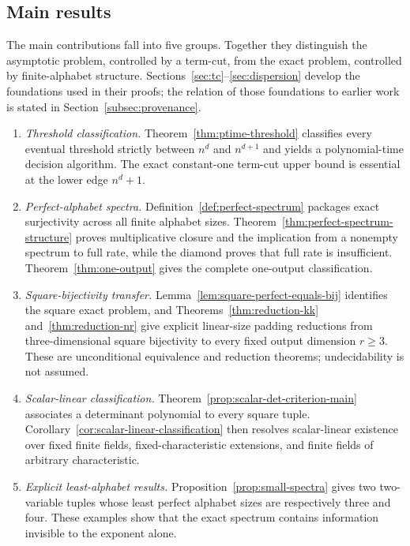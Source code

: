 \documentclass[11pt]{article}
\theoremstyle{definition}
\theoremstyle{plain}
\begin{document}
\subsection{Main results}
\label{subsec:new-results}
The main contributions fall into five groups.  Together they distinguish the asymptotic problem, controlled by
a term-cut, from the exact problem, controlled by finite-alphabet structure.  Sections~\ref{sec:tc}--\ref{sec:dispersion}
develop the foundations used in their proofs; the relation of those foundations to earlier work is stated in
Section~\ref{subsec:provenance}.
\begin{enumerate}[label=(\textbf{N\arabic*}), leftmargin=*]
\item \emph{Threshold classification.}
      Theorem~\ref{thm:ptime-threshold} classifies every eventual threshold strictly between $n^d$ and
      $n^{d+1}$ and yields a polynomial-time decision algorithm.  The exact constant-one term-cut upper bound is
      essential at the lower edge $n^d+1$.
\item \emph{Perfect-alphabet spectra.}
      Definition~\ref{def:perfect-spectrum} packages exact surjectivity across all finite alphabet sizes.
      Theorem~\ref{thm:perfect-spectrum-structure} proves multiplicative closure and the implication from a
      nonempty spectrum to full rate, while the diamond proves that full rate is insufficient.  Theorem~\ref{thm:one-output}
      gives the complete one-output classification.
\item \emph{Square-bijectivity transfer.}
      Lemma~\ref{lem:square-perfect-equals-bij} identifies the square exact problem, and
      Theorems~\ref{thm:reduction-kk} and~\ref{thm:reduction-nr} give explicit linear-size padding reductions
      from three-dimensional square bijectivity to every fixed output dimension $r\ge3$.  These are unconditional
      equivalence and reduction theorems; undecidability is not assumed.
\item \emph{Scalar-linear classification.}
      Theorem~\ref{prop:scalar-det-criterion-main} associates a determinant polynomial to every square tuple.
      Corollary~\ref{cor:scalar-linear-classification} then resolves scalar-linear existence over fixed finite
      fields, fixed-characteristic extensions, and finite fields of arbitrary characteristic.
\item \emph{Explicit least-alphabet results.}
      Proposition~\ref{prop:small-spectra} gives two two-variable tuples whose least perfect alphabet sizes are
      respectively three and four.  These examples show that the exact spectrum contains information invisible
      to the exponent alone.
\end{enumerate}
\end{document}

